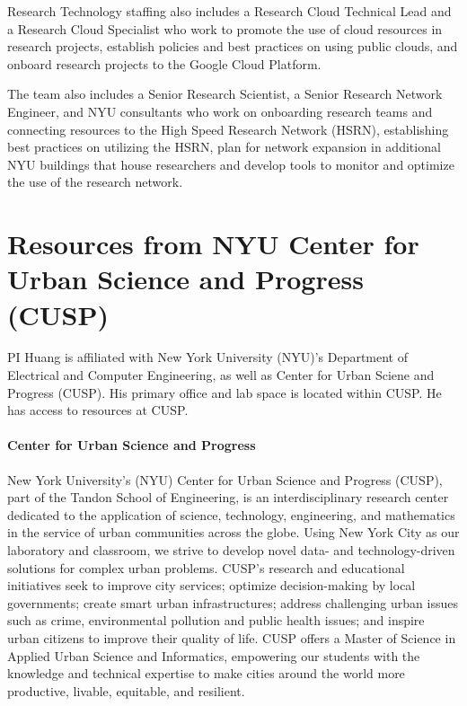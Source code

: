 Research Technology staffing also includes a Research Cloud Technical Lead and a Research Cloud Specialist who work to promote the use of cloud resources in research projects, establish policies and best practices on using public clouds, and onboard research projects to the Google Cloud Platform.

The team also includes a Senior Research Scientist, a Senior Research Network Engineer, and NYU consultants who work on onboarding research teams and connecting resources to the High Speed Research Network (HSRN), establishing best practices on utilizing the HSRN, plan for network expansion in additional NYU buildings that house researchers and develop tools to monitor and optimize the use of the research network.


\section*{Resources from NYU Center for Urban Science and Progress (CUSP)}

PI Huang is affiliated with New York University (NYU)'s Department of Electrical
and Computer Engineering, as well as Center for Urban Sciene and Progress
(CUSP). His primary office and lab space is located within CUSP. He has access
to resources at CUSP.


\paragraph{Center for Urban Science and Progress}
New York University's (NYU) Center for Urban Science and Progress (CUSP), part
of the Tandon School of Engineering, is an interdisciplinary research center
dedicated to the application of science, technology, engineering, and
mathematics in the service of urban communities across the globe. Using New York
City as our laboratory and classroom, we strive to develop novel data- and
technology-driven solutions for complex urban problems. CUSP's research and
educational initiatives seek to improve city services; optimize decision-making
by local governments; create smart urban infrastructures; address challenging
urban issues such as crime, environmental pollution and public health issues;
and inspire urban citizens to improve their quality of life. CUSP offers a
Master of Science in Applied Urban Science and Informatics, empowering our
students with the knowledge and technical expertise to make cities around the
world more productive, livable, equitable, and resilient.

